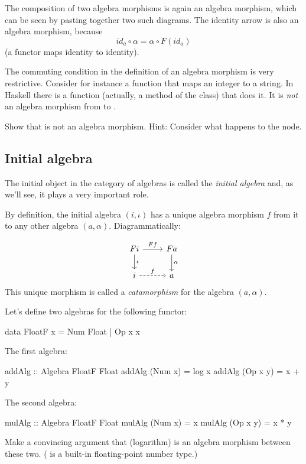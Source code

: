 \documentclass[DaoFP]{subfiles}
\begin{document}
The composition of two algebra morphisms is again an algebra morphism, which can be seen by pasting together two such diagrams. The identity arrow is also an algebra morphism, because 
\[ id_a \circ \alpha = \alpha \circ F (id_a) \]
(a functor maps identity to identity).

The commuting condition in the definition of an algebra morphism is very restrictive. Consider for instance a function that maps an integer to a string. In Haskell there is a  function (actually, a method of the  class) that does it. It is \emph{not} an algebra morphism from  to . 

\begin{exercise}
Show that  is not an algebra morphism. Hint: Consider what happens to the  node.
\end{exercise}

\subsection{Initial algebra}

The initial object in the category of algebras is called the \emph{initial algebra} and, as we'll see, it plays a very important role.

By definition, the initial algebra $(i, \iota)$ has a unique algebra morphism $f$ from it to any other algebra $(a, \alpha)$. Diagrammatically:

\[
 \begin{tikzcd}
 F i 
 \arrow[r, "F f"]
 \arrow[d, "\iota"]
 & F a
\arrow[d, "\alpha"]
 \\
 i
 \arrow[r, dashed, "f"]
 & a
  \end{tikzcd}
\]
 This unique morphism is called a \emph{catamorphism} for the algebra $(a, \alpha)$.


\begin{exercise}
Let's define two algebras for the following functor:
\begin{haskell}
data FloatF x = Num Float | Op x x
\end{haskell}
The first algebra:
\begin{haskell}
addAlg :: Algebra FloatF Float
addAlg (Num x) = log x
addAlg (Op x y) = x + y
\end{haskell}
The second algebra:
\begin{haskell}
mulAlg :: Algebra FloatF Float
mulAlg (Num x) = x
mulAlg (Op x y) = x * y
\end{haskell}
Make a convincing argument that  (logarithm) is an algebra morphism between these two. ( is a built-in floating-point number type.)
\end{exercise}
\end{document}
